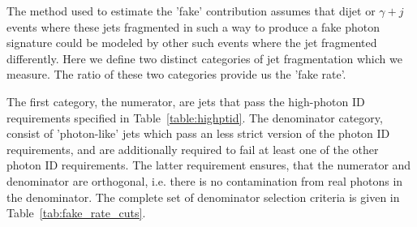 The method used to estimate the 'fake' contribution assumes that dijet or $\gamma + j$ events where these jets fragmented in such a way to produce a fake photon signature could be modeled by other such events where the jet fragmented differently. Here we define two distinct categories of jet fragmentation which we measure. The ratio of these two categories provide us the 'fake rate'. 

The first category, the numerator, are jets that pass the high-\pt photon ID requirements specified in Table~\ref{table:highptid}. The denominator category, consist of 'photon-like' jets which pass an less strict version of the photon ID requirements, and are additionally required to fail at least one of the other photon ID requirements. The latter requirement ensures, that the numerator and denominator are orthogonal, i.e. there is no contamination from real photons in the denominator. The complete set of denominator selection criteria is given in Table~\ref{tab:fake_rate_cuts}. 

